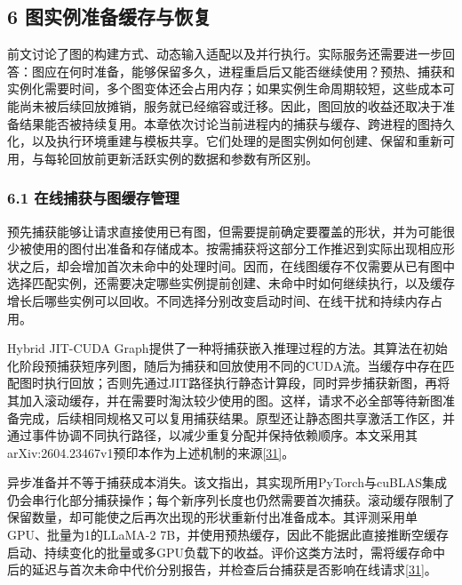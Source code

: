 \documentclass[UTF8,11pt,fontset=windows]{ctexart}
\begin{document}
\endgroup

\hypertarget{section-6}{%
\subsection{\texorpdfstring{\textbf{6 图实例准备缓存与恢复}}{6 图实例准备缓存与恢复}}\label{section-6}}

前文讨论了图的构建方式、动态输入适配以及并行执行。实际服务还需要进一步回答：图应在何时准备，能够保留多久，进程重启后又能否继续使用？预热、捕获和实例化需要时间，多个图变体还会占用内存；如果实例生命周期较短，这些成本可能尚未被后续回放摊销，服务就已经缩容或迁移。因此，图回放的收益还取决于准备结果能否被持续复用。本章依次讨论当前进程内的捕获与缓存、跨进程的图持久化，以及执行环境重建与模板共享。它们处理的是图实例如何创建、保留和重新可用，与每轮回放前更新活跃实例的数据和参数有所区别。

\hypertarget{section-6-1}{%
\subsubsection{\texorpdfstring{\textbf{6.1 在线捕获与图缓存管理}}{6.1 在线捕获与图缓存管理}}\label{section-6-1}}

预先捕获能够让请求直接使用已有图，但需要提前确定要覆盖的形状，并为可能很少被使用的图付出准备和存储成本。按需捕获将这部分工作推迟到实际出现相应形状之后，却会增加首次未命中的处理时间。因而，在线图缓存不仅需要从已有图中选择匹配实例，还需要决定哪些实例提前创建、未命中时如何继续执行，以及缓存增长后哪些实例可以回收。不同选择分别改变启动时间、在线干扰和持续内存占用。

Hybrid JIT-CUDA Graph提供了一种将捕获嵌入推理过程的方法。其算法在初始化阶段预捕获短序列图，随后为捕获和回放使用不同的CUDA流。当缓存中存在匹配图时执行回放；否则先通过JIT路径执行静态计算段，同时异步捕获新图，再将其加入滚动缓存，并在需要时淘汰较少使用的图。这样，请求不必全部等待新图准备完成，后续相同规格又可以复用捕获结果。原型还让静态图共享激活工作区，并通过事件协调不同执行路径，以减少重复分配并保持依赖顺序。本文采用其arXiv:2604.23467v1预印本作为上述机制的来源\protect\hyperlink{ref-31}{{[}31{]}}。

异步准备并不等于捕获成本消失。该文指出，其实现所用PyTorch与cuBLAS集成仍会串行化部分捕获操作；每个新序列长度也仍然需要首次捕获。滚动缓存限制了保留数量，却可能使之后再次出现的形状重新付出准备成本。其评测采用单GPU、批量为1的LLaMA-2 7B，并使用预热缓存，因此不能据此直接推断空缓存启动、持续变化的批量或多GPU负载下的收益。评价这类方法时，需将缓存命中后的延迟与首次未命中代价分别报告，并检查后台捕获是否影响在线请求\protect\hyperlink{ref-31}{{[}31{]}}。
\end{document}
